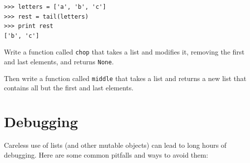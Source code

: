 \documentclass[10pt]{book}
\begin{document}
\beforeverb
\begin{verbatim}
>>> letters = ['a', 'b', 'c']
>>> rest = tail(letters)
>>> print rest
['b', 'c']
\end{verbatim}
\afterverb


\begin{ex}

Write a function called {\tt chop} that takes a list and modifies
it, removing the first and last elements, and returns {\tt None}.

Then write a function called {\tt middle} that takes a list and
returns a new list that contains all but the first and last
elements.

\end{ex}


\section{Debugging}

Careless use of lists (and other mutable objects)
can lead to long hours of debugging.  Here are some common
pitfalls and ways to avoid them:
\end{document}
